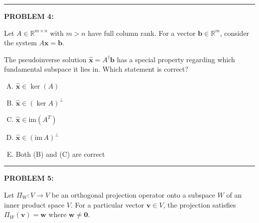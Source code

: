 \documentclass[12pt]{amsart}
\newcommand{\divider}{
  \vspace{-1em} %
  \noindent
  \raisebox{-0.15ex}{\textbullet}%
  \hspace{0.5em}%
  \rule[0.5ex]{0.95\textwidth}{1.0pt}%
  \hspace{0.5em}%
  \raisebox{-0.15ex}{\textbullet}%
  \vspace{0em} %
}
\begin{document}
\divider

\newpage

{\bf PROBLEM 4:}

Let $A \in \mathbb{R}^{m \times n}$ with $m > n$ have full column rank. For a vector $\mathbf{b} \in \mathbb{R}^m$, consider the system $A\mathbf{x} = \mathbf{b}$.

The pseudoinverse solution $\hat{\mathbf{x}} = A^{\dagger}\mathbf{b}$ has a special property regarding which fundamental subspace it lies in. Which statement is correct?

\begin{enumerate}[(A)]
\item $\hat{\mathbf{x}} \in \ker(A)$
\item $\hat{\mathbf{x}} \in (\ker A)^{\perp}$
\item $\hat{\mathbf{x}} \in \text{im}(A^T)$
\item $\hat{\mathbf{x}} \in (\text{im}\,A)^\perp$ 
\item Both (B) and (C) are correct
\end{enumerate}


\divider



{\bf PROBLEM 5:}

Let $\Pi_W: V \to V$ be an orthogonal projection operator onto a subspace $W$ of an inner product space $V$. For a particular vector $\mathbf{v} \in V$, the projection satisfies $\Pi_W(\mathbf{v}) = \mathbf{w}$ where $\mathbf{w} \neq \mathbf{0}$.
\end{document}
